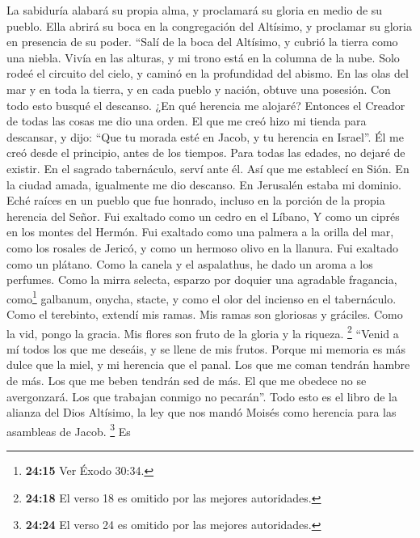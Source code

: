  La sabiduría alabará su propia alma, y proclamará su
gloria en medio de su pueblo.  Ella abrirá su boca en la
congregación del Altísimo, y proclamar su gloria en presencia de su
poder.  ``Salí de la boca del Altísimo, y cubrió la tierra
como una niebla.  Vivía en las alturas, y mi trono está en
la columna de la nube.  Solo rodeé el circuito del cielo,
y caminó en la profundidad del abismo.  En las olas del
mar y en toda la tierra, y en cada pueblo y nación, obtuve una posesión.
 Con todo esto busqué el descanso. ¿En qué herencia me
alojaré?  Entonces el Creador de todas las cosas me dio
una orden. El que me creó hizo mi tienda para descansar, y dijo: ``Que
tu morada esté en Jacob, y tu herencia en Israel''.  Él me
creó desde el principio, antes de los tiempos. Para todas las edades, no
dejaré de existir.  En el sagrado tabernáculo, serví ante
él. Así que me establecí en Sión.  En la ciudad amada,
igualmente me dio descanso. En Jerusalén estaba mi dominio.
 Eché raíces en un pueblo que fue honrado, incluso en la
porción de la propia herencia del Señor.  Fui exaltado
como un cedro en el Líbano, Y como un ciprés en los montes del Hermón.
 Fui exaltado como una palmera a la orilla del mar, como
los rosales de Jericó, y como un hermoso olivo en la llanura. Fui
exaltado como un plátano.  Como la canela y el
aspalathus, he dado un aroma a los perfumes. Como la mirra selecta,
esparzo por doquier una agradable fragancia, como\footnote{\textbf{24:15}
  Ver Éxodo 30:34.} galbanum, onycha, stacte, y como el olor del
incienso en el tabernáculo.  Como el terebinto, extendí
mis ramas. Mis ramas son gloriosas y gráciles.  Como la
vid, pongo la gracia. Mis flores son fruto de la gloria y la riqueza.
 \footnote{\textbf{24:18} El verso 18 es omitido por las
  mejores autoridades.}  ``Venid a mí todos los que me
deseáis, y se llene de mis frutos.  Porque mi memoria es
más dulce que la miel, y mi herencia que el panal.  Los
que me coman tendrán hambre de más. Los que me beben tendrán sed de más.
 El que me obedece no se avergonzará. Los que trabajan
conmigo no pecarán''.  Todo esto es el libro de la
alianza del Dios Altísimo, la ley que nos mandó Moisés como herencia
para las asambleas de Jacob.  \footnote{\textbf{24:24} El
  verso 24 es omitido por las mejores autoridades.}  Es
